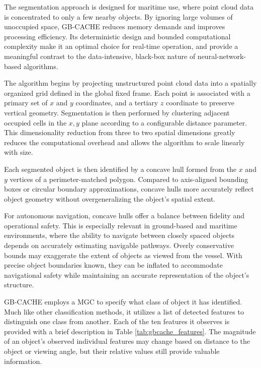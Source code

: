 \documentclass{erauthesis}
\begin{document}
The segmentation approach is designed for maritime use, where point cloud data is concentrated to only a few nearby objects.
By ignoring large volumes of unoccupied space, GB-CACHE reduces memory demands and improves processing efficiency.
Its deterministic design and bounded computational complexity make it an optimal choice for real-time operation, and provide a meaningful contrast to the data-intensive, black-box nature of neural-network-based algorithms.


The algorithm begins by projecting unstructured point cloud data into a spatially organized grid defined in the global fixed frame.
Each point is associated with a primary set of $x$ and $y$ coordinates, and a tertiary $z$ coordinate to preserve vertical geometry.
Segmentation is then performed by clustering adjacent occupied cells in the $x,y$ plane according to a configurable distance parameter.
This dimensionality reduction from three to two spatial dimensions greatly reduces the computational overhead and allows the algorithm to scale linearly with size.


Each segmented object is then identified by a concave hull formed from the $x$ and $y$ vertices of a perimeter-matched polygon.
Compared to axis-aligned bounding boxes or circular boundary approximations, concave hulls more accurately reflect object geometry without overgeneralizing the object’s spatial extent.

For autonomous navigation, concave hulls offer a balance between fidelity and operational safety.
This is especially relevant in ground-based and maritime environments, where the ability to navigate between closely spaced objects depends on accurately estimating navigable pathways.
Overly conservative bounds may exaggerate the extent of objects as viewed from the vessel.
With precise object boundaries known, they can be inflated to accommodate navigational safety while maintaining an accurate representation of the object's structure.

GB-CACHE employs a \acl{MGC} to specify what class of object it has identified. 
Much like other classification methods, it utilizes a list of detected features to distinguish one class from another.
Each of the ten features it observes is provided with a brief description in Table \ref{tab:gbcache_features}.
The magnitude of an object's observed individual features may change based on distance to the object or viewing angle, but their relative values still provide valuable information.
\end{document}
